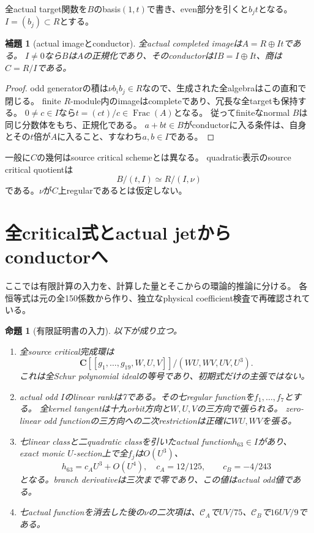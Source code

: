 \documentclass[11pt,a4paper]{ltjsarticle}
\newcommand{\CC}{\mathbf C}
\newcommand{\CA}{\mathcal C_A}
\newcommand{\CB}{\mathcal C_B}
\newcommand{\gvars}{g_1,\ldots,g_{19}}
\newtheorem{proposition}[theorem]{命題}
\newtheorem{lemma}[theorem]{補題}
\theoremstyle{definition}
\theoremstyle{remark}
\begin{document}
全actual target関数を$B$のbasis$(1,t)$で書き、even部分を引くと$b_jt$となる。
$I=(b_j)\subset R$とする。

\begin{lemma}[actual imageとconductor]\label{lem:odd}
全actual completed imageは$A=R\oplus It$である。
$I\ne0$なら$B$は$A$の正規化であり、そのconductorは$IB=I\oplus It$、商は$C=R/I$である。
\end{lemma}
\begin{proof}
odd generatorの積は$\nu b_ib_j\in R$なので、生成された全algebraはこの直和で閉じる。
finite $R$-module内のimageはcompleteであり、冗長な全targetも保持する。
$0\ne c\in I$なら$t=(ct)/c\in\operatorname{Frac}(A)$となる。
従ってfiniteなnormal $B$は同じ分数体をもち、正規化である。
$a+bt\in B$がconductorに入る条件は、自身とその$t$倍が$A$に入ること、すなわち$a,b\in I$である。
\end{proof}

一般に$C$の幾何はsource critical schemeとは異なる。
quadratic表示のsource critical quotientは
\begin{equation}\label{eq:critical}
 B/(t,I)\simeq R/(I,\nu)
\end{equation}
である。$\nu$が$C$上regularであるとは仮定しない。

\section{全critical式とactual jetからconductorへ}

ここでは有限計算の入力を、計算した量とそこからの環論的推論に分ける。
各恒等式は元の全150係数から作り、独立なphysical coefficient検査で再確認されている。

\begin{proposition}[有限証明書の入力]\label{prop:jets}
以下が成り立つ。
\begin{enumerate}
\item 全source critical完成環は
\[
 \CC[[\gvars,W,U,V]]/(WU,WV,UV,U^3).
\]
これは全Schur polynomial idealの等号であり、初期式だけの主張ではない。
\item actual odd $I$のlinear rankは7である。その七regular functionを$f_1,\ldots,f_7$とする。
全kernel tangentは十九orbit方向と$W,U,V$の三方向で張られる。
zero-linear odd functionの三方向への二次restrictionは正確に$WU,WV$を張る。
\item 七linear classと二quadratic classを引いたactual function$h_{63}\in I$があり、
exact monic $U$-section上で全$f_j$は$O(U^3)$、
\[
 h_{63}=c_AU^3+O(U^4),\quad c_A=12/125,
 \qquad c_B=-4/243
\]
となる。branch derivativeは三次まで零であり、この値はactual odd値である。
\item 七actual functionを消去した後の$\nu$の二次項は、$\CA$で$UV/75$、$\CB$で$16UV/9$である。
\end{enumerate}
\end{proposition}
\end{document}
